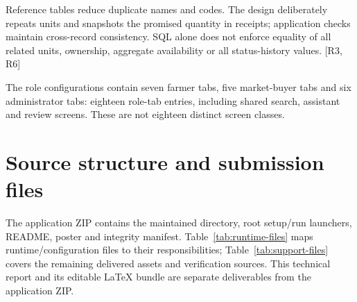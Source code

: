 \documentclass[12pt,a4paper]{report}
\begin{document}
Reference tables reduce duplicate names and codes. The design deliberately repeats units and snapshots the promised quantity in receipts; application checks maintain cross-record consistency. SQL alone does not enforce equality of all related units, ownership, aggregate availability or all status-history values. [R3, R6]


The role configurations contain seven farmer tabs, five market-buyer tabs and six administrator tabs: eighteen role-tab entries, including shared search, assistant and review screens. These are not eighteen distinct screen classes.




\section{Source structure and submission files}
The application ZIP contains the maintained  directory, root setup/run launchers, README, poster and integrity manifest. Table~\ref{tab:runtime-files} maps runtime/configuration files to their responsibilities; Table~\ref{tab:support-files} covers the remaining delivered assets and verification sources. This technical report and its editable LaTeX bundle are separate deliverables from the application ZIP.
\end{document}
